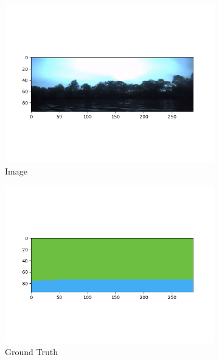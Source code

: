 \documentclass[10pt,twocolumn,letterpaper]{article}
\begin{document}
\begin{figure}[hpt]
\begin{center}
  	\begin{subfigure}{0.3\textwidth}
  		\includegraphics[width=\linewidth, trim={1.25cm 1.5cm 1.5cm 1.25cm},clip]{image2.png}
  		\caption{Image}
  	  \end{subfigure}
  	  \hfill
  	  \begin{subfigure}{0.3\textwidth}
  		\includegraphics[width=\linewidth,trim={1.25cm 1.5cm 1.5cm 1.25cm},clip]{gt2.png}
  		\caption{Ground Truth}
  	\end{subfigure}
  		\hfill
  	\begin{subfigure}{0.3\textwidth}

\end{subfigure}
\end{center}
\end{figure}
\end{document}
